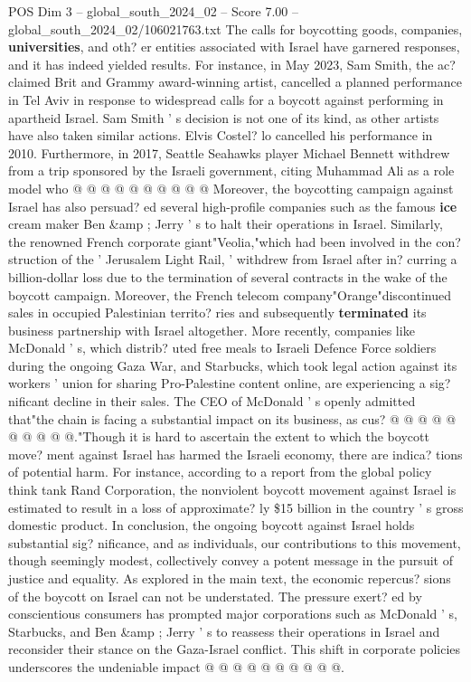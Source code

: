 \begin{textsample}{POS Dim 3 – global\_south\_2024\_02 – Score 7.00 – global\_south\_2024\_02/106021763.txt}
The calls for boycotting goods, companies, \textbf{universities}, and oth? er entities associated with Israel have garnered responses, and it has indeed yielded results.
For instance, in May 2023, Sam Smith, the ac? claimed Brit and Grammy award-winning artist, cancelled a planned performance in Tel Aviv in response to widespread calls for a boycott against performing in apartheid Israel.
Sam Smith ' s decision is not one of its kind, as other artists have also taken similar actions.
Elvis Costel? lo cancelled his performance in 2010.
Furthermore, in 2017, Seattle Seahawks player Michael Bennett withdrew from a trip sponsored by the Israeli government, citing Muhammad Ali as a role model who @ @ @ @ @ @ @ @ @ @ Moreover, the boycotting campaign against Israel has also persuad? ed several high-profile companies such as the famous \textbf{ice} cream maker Ben \&amp ; Jerry ' s to halt their operations in Israel.
Similarly, the renowned French corporate giant"Veolia,"which had been involved in the con? struction of the ' Jerusalem Light Rail, ' withdrew from Israel after in? curring a billion-dollar loss due to the termination of several contracts in the wake of the boycott campaign.
Moreover, the French telecom company"Orange"discontinued sales in occupied Palestinian territo? ries and subsequently \textbf{terminated} its business partnership with Israel altogether.
More recently, companies like McDonald ' s, which distrib? uted free meals to Israeli Defence Force soldiers during the ongoing Gaza War, and Starbucks, which took legal action against its workers ' union for sharing Pro-Palestine content online, are experiencing a sig? nificant decline in their sales.
The CEO of McDonald ' s openly admitted that"the chain is facing a substantial impact on its business, as cus? @ @ @ @ @ @ @ @ @ @."Though it is hard to ascertain the extent to which the boycott move? ment against Israel has harmed the Israeli economy, there are indica? tions of potential harm.
For instance, according to a report from the global policy think tank Rand Corporation, the nonviolent boycott movement against Israel is estimated to result in a loss of approximate? ly \$15 billion in the country ' s gross domestic product.
In conclusion, the ongoing boycott against Israel holds substantial sig? nificance, and as individuals, our contributions to this movement, though seemingly modest, collectively convey a potent message in the pursuit of justice and equality.
As explored in the main text, the economic repercus? sions of the boycott on Israel can not be understated.
The pressure exert? ed by conscientious consumers has prompted major corporations such as McDonald ' s, Starbucks, and Ben \&amp ; Jerry ' s to reassess their operations in Israel and reconsider their stance on the Gaza-Israel conflict.
This shift in corporate policies underscores the undeniable impact @ @ @ @ @ @ @ @ @ @.

\end{textsample}
